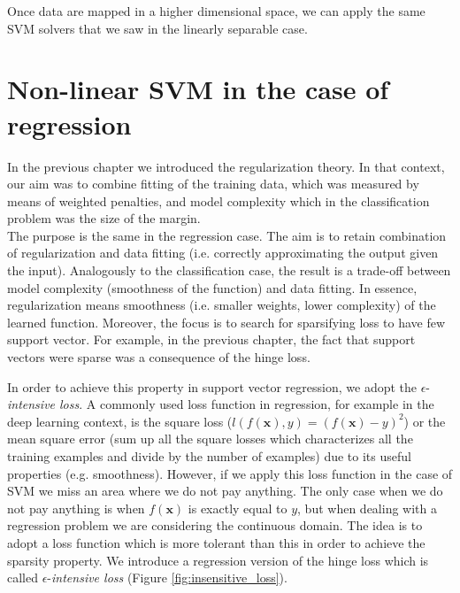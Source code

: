 Once data are mapped in a higher dimensional space, we can apply the same SVM solvers
that we saw in the linearly separable case.

\section{Non-linear SVM in the case of regression}
In the previous chapter we introduced the regularization theory. In that context,
our aim was to combine fitting of the training data, which was measured by means
of weighted penalties, and model complexity which in the classification problem was
the size of the margin.\\ The purpose is the same in the regression case. The
aim is to retain combination of regularization and data fitting (i.e. correctly
approximating the output given the input). Analogously to the classification
case, the result is a trade-off between model complexity (smoothness of the
function) and data fitting. In essence, regularization means smoothness (i.e. smaller
weights, lower complexity) of the learned function. Moreover, the focus is to search
for sparsifying loss to have few support vector. For example, in the previous chapter,
the fact that support vectors were sparse was a consequence of the hinge loss.
\newline

In order to achieve this property in support vector regression, we adopt the $\epsilon$-\textit{intensive
loss}. A commonly used loss function in regression, for example in the deep
learning context, is the square loss ($l(f(\pmb{x}), y) = (f(\pmb{x})-y)^{2}$) or
the mean square error (sum up all the square losses which characterizes all the
training examples and divide by the number of examples) due to its useful properties
(e.g. smoothness). However, if we apply this loss function in the case of SVM we
miss an area where we do not pay anything. The only case when we do not pay anything
is when $f(\pmb{x})$ is exactly equal to $y$, but when dealing with a regression
problem we are considering the continuous domain. The idea is to adopt a loss function
which is more tolerant than this in order to achieve the sparsity property. We
introduce a regression version of the hinge loss which is called $\epsilon$-\textit{intensive
loss} (Figure \ref{fig:insensitive_loss}).


